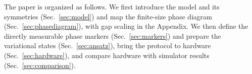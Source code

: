 The paper is organized as follows. We first introduce the model and
its symmetries (Sec.~\ref{sec:model}) and map the finite-size phase
diagram (Sec.~\ref{sec:phasediagram}), with gap scaling in the Appendix.
We then define the directly measurable phase markers
(Sec.~\ref{sec:markers}) and prepare the variational states
(Sec.~\ref{sec:ansatz}), bring the protocol to hardware
(Sec.~\ref{sec:hardware}), and compare hardware with simulator results
(Sec.~\ref{sec:comparison}).
